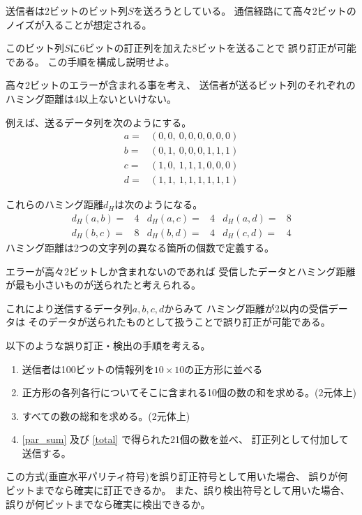 \documentclass[12pt,b5paper]{ltjsarticle}
\begin{document}
\newpage

\hrulefill

送信者は2ビットのビット列$S$を送ろうとしている。
通信経路にて高々2ビットのノイズが入ることが想定される。

このビット列$S$に6ビットの訂正列を加えた8ビットを送ることで
誤り訂正が可能である。
この手順を構成し説明せよ。

\dotfill


高々2ビットのエラーが含まれる事を考え、
送信者が送るビット列のそれぞれのハミング距離は4以上ないといけない。

例えば、送るデータ列を次のようにする。
\begin{align}
 a =& (0,0, \ 0,0,0,0,0,0)\\
 b =& (0,1, \ 0,0,0,1,1,1)\\
 c =& (1,0, \ 1,1,1,0,0,0)\\
 d =& (1,1, \ 1,1,1,1,1,1)
\end{align}

これらのハミング距離$d_H$は次のようになる。
\begin{align}
 d_H(a,b)=& 4 &
 d_H(a,c)=& 4 &
 d_H(a,d)=& 8\\
 d_H(b,c)=& 8 &
 d_H(b,d)=& 4 &
 d_H(c,d)=& 4
\end{align}
ハミング距離は2つの文字列の異なる箇所の個数で定義する。

エラーが高々2ビットしか含まれないのであれば
受信したデータとハミング距離が最も小さいものが送られたと考えられる。

これにより送信するデータ列$a,b,c,d$からみて
ハミング距離が2以内の受信データは
そのデータが送られたものとして扱うことで誤り訂正が可能である。



\newpage

\hrulefill

以下のような誤り訂正・検出の手順を考える。
\begin{enumerate}
 \item
      送信者は100ビットの情報列を$10\times 10$の正方形に並べる
 \item\label{par_sum}
      正方形の各列各行についてそこに含まれる10個の数の和を求める。(2元体上)
 \item\label{total}
      すべての数の総和を求める。(2元体上)
 \item
      \ref{par_sum} 及び \ref{total} で得られた21個の数を並べ、
      訂正列として付加して送信する。
\end{enumerate}

この方式(垂直水平パリティ符号)を誤り訂正符号として用いた場合、
誤りが何ビットまでなら確実に訂正できるか。
また、誤り検出符号として用いた場合、
誤りが何ビットまでなら確実に検出できるか。
\end{document}
